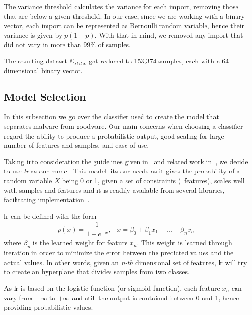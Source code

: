 The variance threshold calculates the variance for each import, removing those that are below a given threshold.
In our case, since we are working with a binary vector, each import can be represented as Bernoulli random variable, hence their variance is given by $p(1-p)$.
With that in mind, we removed any import that did not vary in more than 99\% of samples.

The resulting dataset $\DD_{static}$ got reduced to 153,374 samples, each with a 64 dimensional binary vector.

\subsection{Model Selection}

In this subsection we go over the classifier used to create the model that separates malware from goodware.
Our main concerns when choosing a classifier regard the ability to produce a probabilistic output, good scaling for large number of features and samples, and ease of use.

Taking into consideration the guidelines given in~\cite{rossow:practices,shabtai:survey} and related work in~\cite{miller:rev_int,nissim:al_pdf,rieck:dynamic,schultz:data_mining}, we decide to use \textit{\acrfull{lr}} as our model.
This model fits our needs as it gives the probability of a random variable $X$ being 0 or 1, given a set of constraints (\ie~features), scales well with samples and features and it is readily available from several libraries, facilitating implementation~\cite{friedman2001elements}.

\gls{lr} can be defined with the form
\begin{eqnarray*}
	\rho(x) = \dfrac{1}{1 + e^{-x}},&x = \beta_0 + \beta_1x_1 + ... + \beta_nx_n
\end{eqnarray*}
where $\beta_n$ is the learned weight for feature $x_n$.
This weight is learned through iteration in order to minimize the error between the predicted values and the actual values.
In other words, given an \textit{n-th} dimensional set of features, \gls{lr} will try to create an hyperplane that divides samples from two classes.

As \gls{lr} is based on the logistic function (or sigmoid function), each feature $x_n$ can vary from $-\infty$ to $+\infty$ and still the output is contained between 0 and 1, hence providing probabilistic values.

